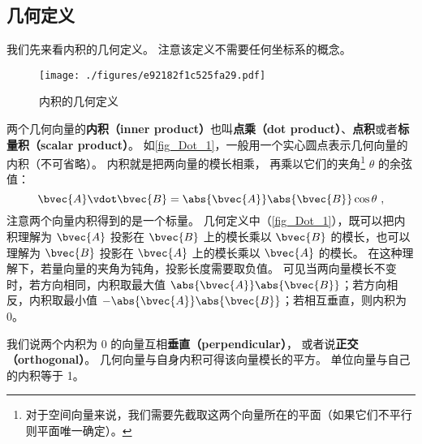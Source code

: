 
\subsection{几何定义}
我们先来看内积的几何定义。 注意该定义不需要任何坐标系的概念。
\begin{figure}[th]
\centering
\texttt{[image: ./figures/e92182f1c525fa29.pdf]}
\caption{内积的几何定义}\label{fig_Dot_1}
\end{figure}

两个几何向量的\textbf{内积（inner product）}也叫\textbf{点乘（dot product）}、\textbf{点积}或者\textbf{标量积（scalar product）}。 如\autoref{fig_Dot_1}，一般用一个实心圆点表示几何向量的内积（不可省略）。 内积就是把两向量的模长相乘， 再乘以它们的夹角\footnote{对于空间向量来说，我们需要先截取这两个向量所在的平面（如果它们不平行则平面唯一确定）。} $\theta$ 的余弦值：
\begin{equation}\label{eq_Dot_1}
\bvec{A} \vdot \bvec{B} = \abs{\bvec{A}} \abs{\bvec{B}} \cos\theta ~,
\end{equation}
注意两个向量内积得到的是一个标量。 几何定义中（\autoref{fig_Dot_1}），既可以把内积理解为 $\bvec{A}$ 投影在 $\bvec{B}$ 上的模长乘以 $\bvec{B}$ 的模长，也可以理解为 $\bvec{B}$ 投影在 $\bvec{A}$ 上的模长乘以 $\bvec{A}$ 的模长。 在这种理解下，若量向量的夹角为钝角，投影长度需要取负值。 可见当两向量模长不变时，若方向相同，内积取最大值 $\abs{\bvec{A}}\abs{\bvec{B}}$；若方向相反，内积取最小值 $-\abs{\bvec{A}}\abs{\bvec{B}}$；若相互垂直，则内积为 0。

我们说两个内积为 0 的向量互相\textbf{垂直（perpendicular）}， 或者说\textbf{正交（orthogonal）}。 几何向量与自身内积可得该向量模长的平方。 单位向量与自己的内积等于 1。 


